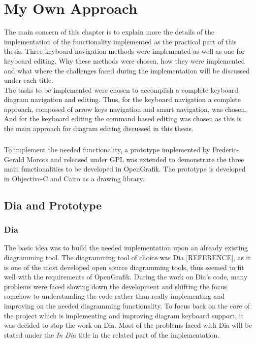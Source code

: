 \chapter{My Own Approach}
\beginchapter
The main concern of this chapter is to explain more the details of the implementation of the functionality implemented as the practical part of this thesis. Three keyboard navigation methods were implemented as well as one for keyboard editing. Why these methods were chosen, how they were implemented and what where the challenges faced during the implementation will be discussed under each title.\\
The tasks to be implemented were chosen to accomplish a complete keyboard diagram navigation and editing. Thus, for the keyboard navigation a complete approach, composed of arrow keys navigation and smart navigation, was chosen. And for the keyboard editing the command based editing was chosen as this is the main approach for diagram editing discussed in this thesis.

\paragraph{}
To implement the needed functionality, a prototype implemented by Frederic-Gerald Morcos and released under GPL was extended to demonstrate the three main functionalities to be developed in OpenGrafik. The prototype is developed in Objective-C and Cairo as a drawing library.

\section{Dia and Prototype}
\subsection{Dia}
The basic idea was to build the needed implementation upon an already existing diagramming tool. The diagramming tool of choice was Dia [REFERENCE], as it is one of the most developed open source diagramming tools, thus seemed to fit well with the requirements of OpenGrafik. During the work on Dia's code, many problems were faced slowing down the development and shifting the focus somehow to understanding the code rather than really implementing and improving on the needed diagramming functionality. To focus back on the core of the project which is implementing and improving diagram keyboard support, it was decided to stop the work on Dia. Most of the problems faced with Dia will be stated under the {\it In Dia} title in the related part of the implementation.

